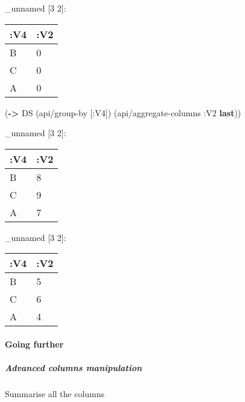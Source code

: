 \documentclass[]{article}
\newenvironment{Shaded}{\begin{snugshade}}{\end{snugshade}}
\newcommand{\AttributeTok}[1]{\textcolor[rgb]{0.77,0.63,0.00}{#1}}
\newcommand{\CommentTok}[1]{\textcolor[rgb]{0.56,0.35,0.01}{\textit{#1}}}
\newcommand{\DecValTok}[1]{\textcolor[rgb]{0.00,0.00,0.81}{#1}}
\newcommand{\KeywordTok}[1]{\textcolor[rgb]{0.13,0.29,0.53}{\textbf{#1}}}
\newcommand{\NormalTok}[1]{#1}
\newcommand{\VariableTok}[1]{\textcolor[rgb]{0.00,0.00,0.00}{#1}}
\let\oldparagraph\paragraph
\renewcommand{\paragraph}[1]{\oldparagraph{#1}\mbox{}}
\let\oldsubparagraph\subparagraph
\renewcommand{\subparagraph}[1]{\oldsubparagraph{#1}\mbox{}}
\begin{document}
\_unnamed {[}3 2{]}:

\begin{longtable}[]{@{}ll@{}}
\toprule
:V4 & :V2\tabularnewline
\midrule
\endhead
B & 0\tabularnewline
C & 0\tabularnewline
A & 0\tabularnewline
\bottomrule
\end{longtable}

\begin{Shaded}
\begin{Highlighting}[]
\NormalTok{(}\KeywordTok{->}\NormalTok{ DS}
\NormalTok{    (api/group-by [}\AttributeTok{:V4}\NormalTok{])}
\NormalTok{    (api/aggregate-columns }\AttributeTok{:V2} \KeywordTok{last}\NormalTok{))}
\end{Highlighting}
\end{Shaded}

\_unnamed {[}3 2{]}:

\begin{longtable}[]{@{}ll@{}}
\toprule
:V4 & :V2\tabularnewline
\midrule
\endhead
B & 8\tabularnewline
C & 9\tabularnewline
A & 7\tabularnewline
\bottomrule
\end{longtable}

\begin{Shaded}
\end{Shaded}

\_unnamed {[}3 2{]}:

\begin{longtable}[]{@{}ll@{}}
\toprule
:V4 & :V2\tabularnewline
\midrule
\endhead
B & 5\tabularnewline
C & 6\tabularnewline
A & 4\tabularnewline
\bottomrule
\end{longtable}

\hypertarget{going-further}{%
\paragraph{Going further}\label{going-further}}

\hypertarget{advanced-columns-manipulation}{%
\subparagraph{Advanced columns
manipulation}\label{advanced-columns-manipulation}}

Summarise all the columns

\begin{Shaded}
\end{Shaded}
\end{document}
